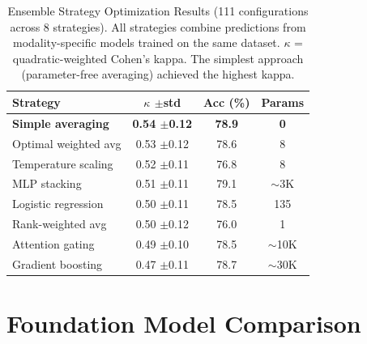 \documentclass[journal,twoside,web]{ieeecolor}
\begin{document}
\begin{table}[H]
\renewcommand{\arraystretch}{1.15}
\caption{Ensemble Strategy Optimization Results (111 configurations across 8 strategies). All strategies combine predictions from modality-specific models trained on the same dataset. $\kappa$ = quadratic-weighted Cohen's kappa. The simplest approach (parameter-free averaging) achieved the highest kappa.}
\label{tab:ensemble_strategies}
\centering
\footnotesize
\begin{tabular}{|l|c|c|c|}
\hline
\textbf{Strategy} & \textbf{$\kappa$ $\pm$std} & \textbf{Acc (\%)} & \textbf{Params} \\
\hline
\textbf{Simple averaging} & \textbf{0.54 $\pm$0.12} & \textbf{78.9} & \textbf{0} \\
Optimal weighted avg & 0.53 $\pm$0.12 & 78.6 & 8 \\
Temperature scaling & 0.52 $\pm$0.11 & 76.8 & 8 \\
MLP stacking & 0.51 $\pm$0.11 & 79.1 & $\sim$3K \\
Logistic regression & 0.50 $\pm$0.11 & 78.5 & 135 \\
Rank-weighted avg & 0.50 $\pm$0.12 & 76.0 & 1 \\
Attention gating & 0.49 $\pm$0.10 & 78.5 & $\sim$10K \\
Gradient boosting & 0.47 $\pm$0.11 & 78.7 & $\sim$30K \\
\hline
\end{tabular}
\end{table}

\section{Foundation Model Comparison}
\label{app:foundation}
\end{document}

